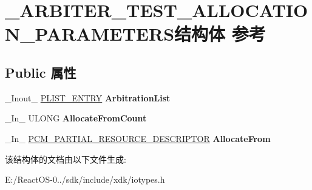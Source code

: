 \hypertarget{struct___a_r_b_i_t_e_r___t_e_s_t___a_l_l_o_c_a_t_i_o_n___p_a_r_a_m_e_t_e_r_s}{}\section{\+\_\+\+A\+R\+B\+I\+T\+E\+R\+\_\+\+T\+E\+S\+T\+\_\+\+A\+L\+L\+O\+C\+A\+T\+I\+O\+N\+\_\+\+P\+A\+R\+A\+M\+E\+T\+E\+R\+S结构体 参考}
\label{struct___a_r_b_i_t_e_r___t_e_s_t___a_l_l_o_c_a_t_i_o_n___p_a_r_a_m_e_t_e_r_s}
\subsection*{Public 属性}
\begin{DoxyCompactItemize}
\item 
\mbox{\label{struct___a_r_b_i_t_e_r___t_e_s_t___a_l_l_o_c_a_t_i_o_n___p_a_r_a_m_e_t_e_r_s_aa400bb52a8fd24ab1914a94e934e8dea}} 
\+\_\+\+Inout\+\_\+ \hyperlink{struct___l_i_s_t___e_n_t_r_y}{P\+L\+I\+S\+T\+\_\+\+E\+N\+T\+RY} {\bfseries Arbitration\+List}
\item 
\mbox{\label{struct___a_r_b_i_t_e_r___t_e_s_t___a_l_l_o_c_a_t_i_o_n___p_a_r_a_m_e_t_e_r_s_a7513be077731c00f9cb375650f6926fa}} 
\+\_\+\+In\+\_\+ U\+L\+O\+NG {\bfseries Allocate\+From\+Count}
\item 
\mbox{\label{struct___a_r_b_i_t_e_r___t_e_s_t___a_l_l_o_c_a_t_i_o_n___p_a_r_a_m_e_t_e_r_s_a2e52db1f730b966d6b2a9abb26d46e57}} 
\+\_\+\+In\+\_\+ \hyperlink{struct___c_m___p_a_r_t_i_a_l___r_e_s_o_u_r_c_e___d_e_s_c_r_i_p_t_o_r}{P\+C\+M\+\_\+\+P\+A\+R\+T\+I\+A\+L\+\_\+\+R\+E\+S\+O\+U\+R\+C\+E\+\_\+\+D\+E\+S\+C\+R\+I\+P\+T\+OR} {\bfseries Allocate\+From}
\end{DoxyCompactItemize}


该结构体的文档由以下文件生成\+:\begin{DoxyCompactItemize}
\item 
E\+:/\+React\+O\+S-\/0../sdk/include/xdk/iotypes.\+h\end{DoxyCompactItemize}
